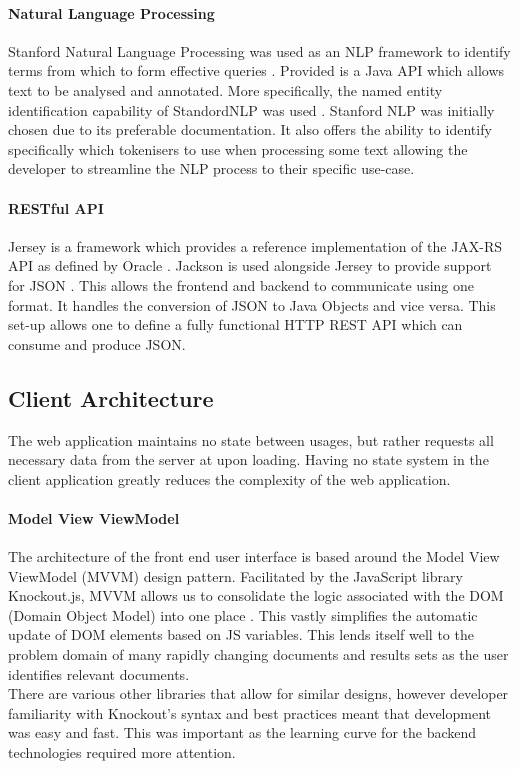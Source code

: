 \documentclass{l4proj}
\begin{document}
\paragraph{Natural Language Processing}
Stanford Natural Language Processing was used as an NLP framework to identify terms from which to form effective queries \cite{manning-EtAl:2014:P14-5}. Provided is a Java API which allows text to be analysed and annotated. More specifically, the named entity identification capability of StandordNLP was used \cite{finkel2005incorporating}.
Stanford NLP was initially chosen due to its preferable documentation. It also offers the ability to identify specifically which tokenisers to use when processing some text allowing the developer to streamline the NLP process to their specific use-case.

\paragraph{RESTful API}
Jersey is a framework which provides a reference implementation of the JAX-RS API as defined by Oracle \cite{jersey} \cite{jaxrsapi}.
Jackson is used alongside Jersey to provide support for JSON \cite{jackson}. This allows the frontend and backend to communicate using one format. It handles the conversion of JSON to Java Objects and vice versa.
This set-up allows one to define a fully functional HTTP REST API which can consume and produce JSON.

\subsection{Client Architecture}
The web application maintains no state between usages, but rather requests all necessary data from the server at upon loading. Having no state system in the client application greatly reduces the complexity of the web application.
\paragraph{Model View ViewModel}
The architecture of the front end user interface is based around the Model View ViewModel (MVVM) design pattern. Facilitated by the JavaScript library Knockout.js, MVVM allows us to consolidate the logic associated with the DOM (Domain Object Model) into one place \cite{knockout}.
This vastly simplifies the automatic update of DOM elements based on JS variables.
This lends itself well to the problem domain of many rapidly changing documents and results sets as the user identifies relevant documents. \\
There are various other libraries that allow for similar designs, however developer familiarity with Knockout's syntax and best practices meant that development was easy and fast.
This was important as the learning curve for the backend technologies required more attention.
\end{document}
